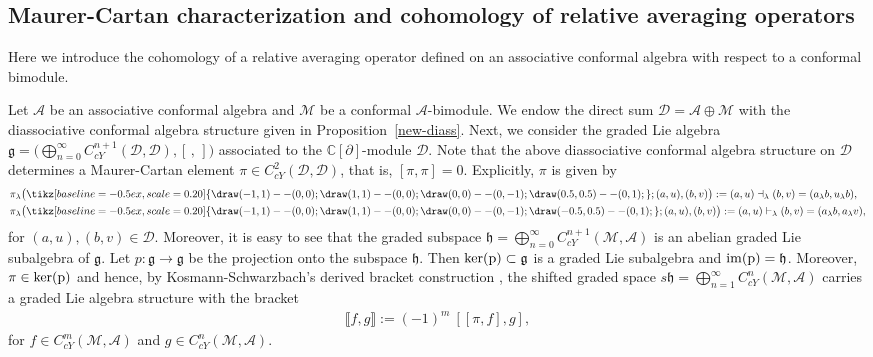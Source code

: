 \documentclass[a4paper,reqno,10pt]{amsart}
\theoremstyle{plain}
\theoremstyle{definition}
\theoremstyle{remark}
\newcommand{\C}{\mathbb{C}}
\newcommand{\D}{\mathcal{D}}
\newcommand{\M}{\mathcal{M}}
\newcommand{\la}{\lambda}
\begin{document}
\subsection*{Maurer-Cartan characterization and cohomology of relative averaging operators} Here we introduce the cohomology of a relative averaging operator defined on an associative conformal algebra with respect to a conformal bimodule. 

\medskip

Let $\mathcal{A}$ be an associative conformal algebra and $\M$ be a conformal $\mathcal{A}$-bimodule. We endow the direct sum $\D= \mathcal{A} \oplus \M$ with the diassociative conformal algebra structure given in Proposition~\ref{new-diass}. Next, we consider the graded Lie algebra $ \mathfrak{g} =\big( \bigoplus \limits_{n=0}^{\infty}C_{cY}^{n+1}(\D,\D),[\,,\,] \big)$ associated to the $\C [\partial]$-module $\D$.
Note that the above diassociative conformal algebra structure on $\D$ determines a Maurer-Cartan element $\pi \in C_{cY}^{2}(\D, \D)$, that is, $[\pi, \pi]=0$. Explicitly, $\pi$ is given by 
\begin{align*}
    &\pi_ \la \big (\tikz[baseline=-0.5ex,scale=0.20]{
  \draw (-1,1)--(0,0);
  \draw (1,1)--(0,0);
  \draw (0,0)--(0,-1);
  \draw (0.5,0.5)--(0,1);
}; (a,u), (b,v)\big)  := (a,u) \dashv_{\la } (b,v) = ( a _ \la b, u _\la b),\\
& \pi_ \la \big( \tikz[baseline=-0.5ex,scale=0.20]{
  \draw (-1,1)--(0,0);
  \draw (1,1)--(0,0);
  \draw (0,0)--(0,-1);
  \draw (-0.5,0.5)--(0,1);
}; (a,u), (b,v) \big):= (a,u)\vdash_{\la} (b,v) = (a _ \la b, a_\la v),
\end{align*}
for $(a,u), (b,v) \in \D$.  Moreover, it is easy to see that the graded subspace $\mathfrak{h}=\bigoplus \limits_{n = 0} ^{\infty}C_{cY}^{n+1}(\M,\mathcal{A})$ is an abelian graded Lie subalgebra of $\mathfrak{g}$. Let $p: \mathfrak{g} \rightarrow \mathfrak{g}$ be the projection onto the subspace $\mathfrak{h}$. Then $\rm{ker}(p) \subset \mathfrak{g}$ is a graded Lie subalgebra and $\rm{im}(p)=\mathfrak{h}$. Moreover, $\pi \in \rm{ker}(p)$ and hence, by Kosmann-Schwarzbach’s derived bracket construction \cite{kosmann}, the shifted graded space $s\mathfrak{h}=\bigoplus \limits_{n = 1} ^{\infty}C_{cY}^{n}(\M,\mathcal{A})$ carries a graded Lie algebra structure with the bracket 
 \begin{align*}
\llbracket f, g \rrbracket := (-1)^{m} ~ \! [[\pi, f],g],
\end{align*}
for $f \in  C_{cY} ^{m }(\M,\mathcal{A})$ and $g \in  C_{cY} ^{n }(\M,\mathcal{A})$. 
\end{document}
